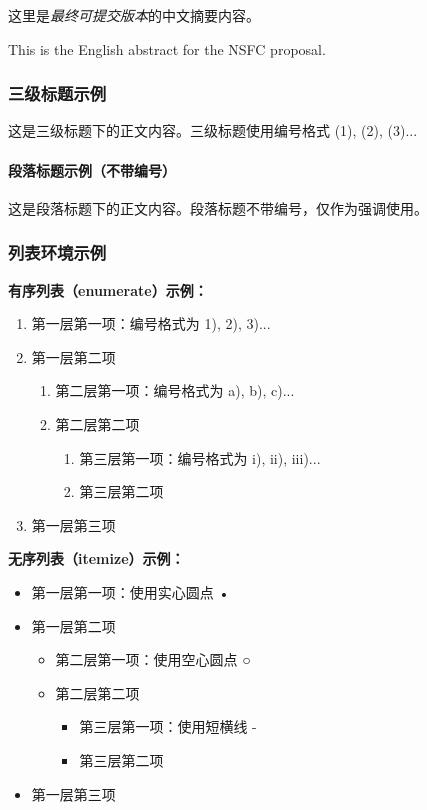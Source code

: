 \documentclass[UTF8,zihao=-4]{ctexart} %
\begin{document}
   \nsfcTitlePage
   \begin{nsfcAbstractZH}
     这里是\emph{最终可提交版本}的中文摘要内容。
   \end{nsfcAbstractZH}

   \begin{nsfcAbstractEN}
     This is the English abstract for the NSFC proposal.
   \end{nsfcAbstractEN}

  \zhlipsum[1-2]
   \subsubsection{三级标题示例}
   这是三级标题下的正文内容。三级标题使用编号格式 (1), (2), (3)...

   \paragraph{段落标题示例（不带编号）}
   这是段落标题下的正文内容。段落标题不带编号，仅作为强调使用。

   \subsubsection{列表环境示例}

   \textbf{有序列表（enumerate）示例：}
   \begin{enumerate}
     \item 第一层第一项：编号格式为 1), 2), 3)...
     \item 第一层第二项
     \begin{enumerate}
       \item 第二层第一项：编号格式为 a), b), c)...
       \item 第二层第二项
       \begin{enumerate}
         \item 第三层第一项：编号格式为 i), ii), iii)...
         \item 第三层第二项
       \end{enumerate}
     \end{enumerate}
     \item 第一层第三项
   \end{enumerate}

   \textbf{无序列表（itemize）示例：}
   \begin{itemize}
     \item 第一层第一项：使用实心圆点 •
     \item 第一层第二项
     \begin{itemize}
       \item 第二层第一项：使用空心圆点 ○
       \item 第二层第二项
       \begin{itemize}
         \item 第三层第一项：使用短横线 -
         \item 第三层第二项
       \end{itemize}
     \end{itemize}
     \item 第一层第三项
   \end{itemize}
\end{document}
